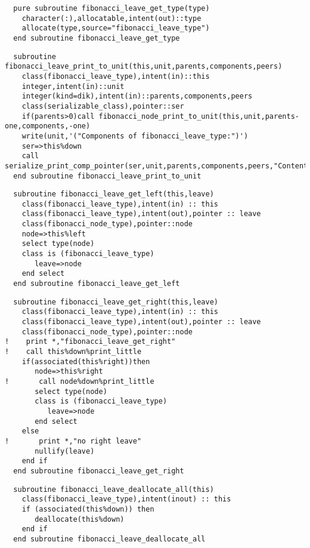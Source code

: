 
\begin{Verbatim}
  pure subroutine fibonacci_leave_get_type(type)
    character(:),allocatable,intent(out)::type
    allocate(type,source="fibonacci_leave_type")
  end subroutine fibonacci_leave_get_type
\end{Verbatim}

\begin{Verbatim}
  subroutine fibonacci_leave_print_to_unit(this,unit,parents,components,peers)
    class(fibonacci_leave_type),intent(in)::this
    integer,intent(in)::unit
    integer(kind=dik),intent(in)::parents,components,peers
    class(serializable_class),pointer::ser
    if(parents>0)call fibonacci_node_print_to_unit(this,unit,parents-one,components,-one)
    write(unit,'("Components of fibonacci_leave_type:")')
    ser=>this%down
    call serialize_print_comp_pointer(ser,unit,parents,components,peers,"Content:")
  end subroutine fibonacci_leave_print_to_unit
\end{Verbatim}

\begin{Verbatim}
  subroutine fibonacci_leave_get_left(this,leave)
    class(fibonacci_leave_type),intent(in) :: this
    class(fibonacci_leave_type),intent(out),pointer :: leave
    class(fibonacci_node_type),pointer::node
    node=>this%left
    select type(node)
    class is (fibonacci_leave_type)
       leave=>node
    end select
  end subroutine fibonacci_leave_get_left
\end{Verbatim}
  
\begin{Verbatim}
  subroutine fibonacci_leave_get_right(this,leave)
    class(fibonacci_leave_type),intent(in) :: this
    class(fibonacci_leave_type),intent(out),pointer :: leave
    class(fibonacci_node_type),pointer::node
!    print *,"fibonacci_leave_get_right"
!    call this%down%print_little
    if(associated(this%right))then
       node=>this%right
!       call node%down%print_little
       select type(node)
       class is (fibonacci_leave_type)
          leave=>node
       end select
    else
!       print *,"no right leave"
       nullify(leave)
    end if
  end subroutine fibonacci_leave_get_right
\end{Verbatim}
  
\begin{Verbatim}
  subroutine fibonacci_leave_deallocate_all(this)
    class(fibonacci_leave_type),intent(inout) :: this
    if (associated(this%down)) then
       deallocate(this%down)
    end if
  end subroutine fibonacci_leave_deallocate_all
\end{Verbatim}

